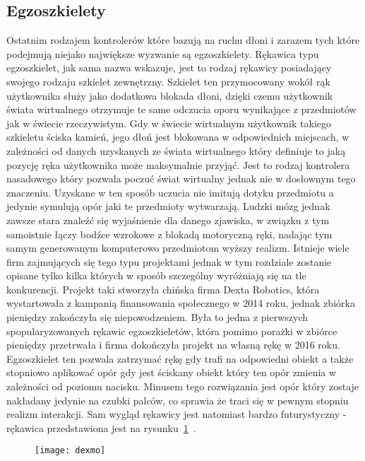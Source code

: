	\subsection{Egzoszkielety}
	\label{subsec:egzo}	
	Ostatnim rodzajem kontrolerów które bazują na ruchu dłoni i zarazem tych które podejmują niejako największe wyzwanie są egzoszkielety. Rękawica typu egzoszkielet, jak sama nazwa wskazuje, jest to rodzaj rękawicy posiadający swojego rodzaju szkielet zewnętrzny. Szkielet ten przymocowany wokół rąk użytkownika służy jako dodatkowa blokada dłoni, dzięki czemu użytkownik świata wirtualnego otrzymuje te same odczucia oporu wynikające z przedmiotów jak w świecie rzeczywistym. Gdy w świecie wirtualnym użytkownik takiego szkieletu ściska kamień, jego dłoń jest blokowana w odpowiednich miejscach, w zależności od danych uzyskanych ze świata wirtualnego który definiuje to jaką pozycję ręka użytkownika może maksymalnie przyjąć. Jest to rodzaj kontrolera nasadowego który pozwala poczuć świat wirtualny jednak nie w dosłownym tego znaczeniu. Uzyskane w ten sposób uczucia nie imitują dotyku przedmiotu a jedynie symulują opór jaki te przedmioty wytwarzają. Ludzki mózg jednak zawsze stara znaleźć się wyjaśnienie dla danego zjawiska, w związku z tym samoistnie łączy bodźce wzrokowe z blokadą motoryczną ręki, nadając tym samym generowanym komputerowo przedmiotom wyższy realizm. Istnieje wiele firm zajmujących się tego typu projektami jednak w tym rozdziale zostanie opisane tylko kilka których w sposób szczególny wyróżniają się na tle konkurencji.
	 Projekt taki stworzyła chińska firma Dexta Robotics, która wystartowała z kampanią finansowania społecznego w 2014 roku, jednak zbiórka pieniędzy zakończyła się niepowodzeniem. Była to jedna z pierwszych  spopularyzowanych rękawic egzoszkieletów, która pomimo porażki w zbiórce pieniędzy przetrwała i firma dokończyła projekt na własną rękę w 2016 roku. Egzoszkielet ten pozwala zatrzymać rękę gdy trafi na odpowiedni obiekt a także stopniowo aplikować opór gdy jest ściskany obiekt który ten opór zmienia w zależności od poziomu nacisku. Minusem tego rozwiązania jest opór który zostaje nakładany jedynie na czubki palców, co sprawia że traci się w pewnym stopniu realizm interakcji. Sam wygląd rękawicy jest natomiast bardzo futurystyczny - rękawica przedstawiona jest na rysunku~\ref{fig:dexmo}~\cite{dexta}.
	 \begin{figure}[h]
	 \centering
	\texttt{[image: dexmo]}
	\label{fig:dexmo}
	\end{figure}	
